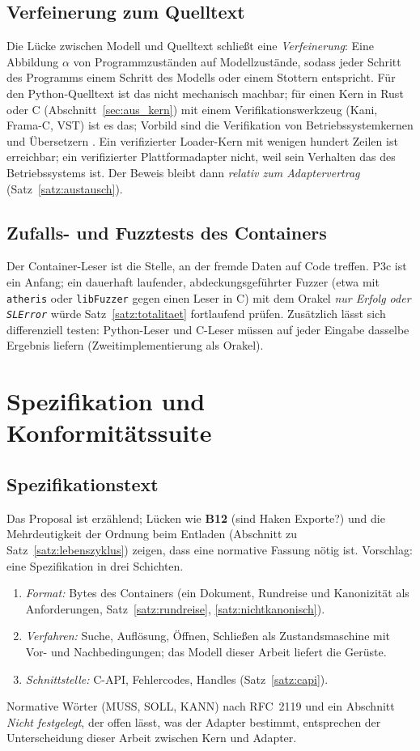 \documentclass[a4paper,12pt,twoside]{report}
\DeclareRobustCommand{\_}{\ifmmode\mbox{\textunderscore}\else\textunderscore\allowbreak{}\fi}
\theoremstyle{definition}
\newcommand{\Bf}[1]{\textbf{B#1}}
\begin{document}
\subsection{Verfeinerung zum Quelltext}
Die Lücke zwischen Modell und Quelltext schließt eine \emph{Verfeinerung}: Eine Abbildung $\alpha$ von Programmzuständen auf Modellzustände, sodass jeder Schritt des Programms einem Schritt des Modells oder einem Stottern entspricht. Für den Python-Quelltext ist das nicht mechanisch machbar; für einen Kern in Rust oder C (Abschnitt~\ref{sec:aus_kern}) mit einem Verifikationswerkzeug (Kani, Frama-C, VST) ist es das; Vorbild sind die Verifikation von Betriebssystemkernen \cite{klein2009} und Übersetzern \cite{leroy2009}. Ein verifizierter Loader-Kern mit wenigen hundert Zeilen ist erreichbar; ein verifizierter Plattformadapter nicht, weil sein Verhalten das des Betriebssystems ist. Der Beweis bleibt dann \emph{relativ zum Adaptervertrag} (Satz~\ref{satz:austausch}).

\subsection{Zufalls- und Fuzztests des Containers}
Der Container-Leser ist die Stelle, an der fremde Daten auf Code treffen. P3c ist ein Anfang; ein dauerhaft laufender, abdeckungsgeführter Fuzzer (etwa mit \texttt{atheris} oder \texttt{libFuzzer} gegen einen Leser in C) mit dem Orakel \emph{nur Erfolg oder \texttt{SLError}} würde Satz~\ref{satz:totalitaet} fortlaufend prüfen. Zusätzlich lässt sich differenziell testen: Python-Leser und C-Leser müssen auf jeder Eingabe dasselbe Ergebnis liefern (Zweitimplementierung als Orakel).

\section{Spezifikation und Konformitätssuite}
\label{sec:aus_spez}

\subsection{Spezifikationstext}
Das Proposal ist erzählend; Lücken wie \Bf{12} (sind Haken Exporte?) und die Mehrdeutigkeit der Ordnung beim Entladen (Abschnitt zu Satz~\ref{satz:lebenszyklus}) zeigen, dass eine normative Fassung nötig ist. Vorschlag: eine Spezifikation in drei Schichten.
\begin{enumerate}
	\item \emph{Format:} Bytes des Containers (ein Dokument, Rundreise und Kanonizität als Anforderungen, Satz~\ref{satz:rundreise}, \ref{satz:nichtkanonisch}).
	\item \emph{Verfahren:} Suche, Auflösung, Öffnen, Schließen als Zustandsmaschine mit Vor- und Nachbedingungen; das Modell dieser Arbeit liefert die Gerüste.
	\item \emph{Schnittstelle:} C-API, Fehlercodes, Handles (Satz~\ref{satz:capi}).
\end{enumerate}
Normative Wörter (MUSS, SOLL, KANN) nach RFC~2119 und ein Abschnitt \emph{Nicht festgelegt}, der offen lässt, was der Adapter bestimmt, entsprechen der Unterscheidung dieser Arbeit zwischen Kern und Adapter.
\end{document}
